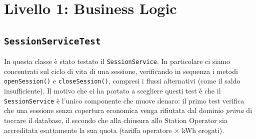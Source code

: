 \section{Livello 1: Business Logic}

\subsection{\texttt{SessionServiceTest}}

In questa classe è stato testato il \texttt{SessionService}. In particolare ci siamo concentrati sul ciclo di vita di una sessione, verificando in sequenza i metodi \texttt{openSession()} e \texttt{closeSession()}, compresi i flussi alternativi (come il saldo insufficiente). Il motivo che ci ha portato a scegliere questi test è che il \texttt{SessionService} è l'unico componente che muove denaro: il primo test verifica che una sessione senza copertura economica venga rifiutata dal dominio \emph{prima} di toccare il database, il secondo che alla chiusura allo Station Operator sia accreditata esattamente la sua quota (tariffa operatore $\times$ kWh erogati).


